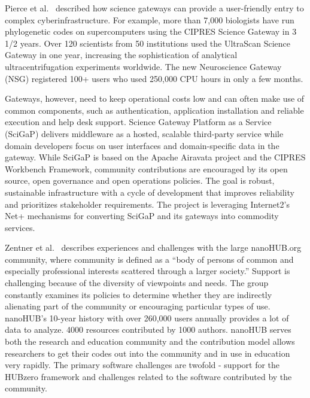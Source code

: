 \documentclass[11pt, oneside]{amsart}
\newcommand{\toolname}[1] {\textsf{#1}}
\begin{document}
Pierce et al.~\cite{Pierce2_WSSSPE} described how science gateways can provide a user-friendly
entry to complex cyberinfrastructure. For example, more than 7,000
biologists have run phylogenetic codes on supercomputers using the \toolname{CIPRES}
Science Gateway in 3 1/2 years. Over 120 scientists from 50 institutions used the
\toolname{UltraScan Science Gateway} in one year, increasing the sophistication of analytical
ultracentrifugation experiments worldwide. The new Neuroscience Gateway (\toolname{NSG})
registered 100+ users who used 250,000 CPU hours in only a few months.

Gateways, however, need to keep operational costs low and can often make use of
common components, such as authentication, application installation and
reliable execution and help desk support. Science Gateway Platform as a Service (\toolname{SciGaP}) delivers
middleware as a hosted, scalable third-party service while domain developers
focus on user interfaces and domain-specific data in the gateway.
While \toolname{SciGaP} is based on the \toolname{Apache Airavata} project
and the \toolname{CIPRES} Workbench Framework, community contributions are encouraged
by its open source, open governance and open operations policies. The
goal is robust, sustainable infrastructure with a cycle of development that
improves reliability and prioritizes stakeholder requirements. The project is
leveraging Internet2's \toolname{Net+} mechanisms for converting \toolname{SciGaP} and its gateways
into commodity services.

Zentner et al.~\cite{Zentner_WSSSPE} describes experiences and challenges with the large
\toolname{nanoHUB.org} community, where community is defined as a ``body of persons of
common and especially professional interests scattered through a larger
society.'' Support is challenging because of the diversity of
viewpoints and needs. The group constantly examines its policies to determine
whether they are indirectly alienating part of the community or encouraging
particular types of use.
%
\toolname{nanoHUB}'s 10-year history with over 260,000 users annually provides a lot of
data to analyze. 4000 resources contributed by 1000 authors. \toolname{nanoHUB} serves
both the research and education community and the contribution model allows
researchers to get their codes out into the community and in use in education
very rapidly. The primary software challenges are twofold - support for the
\toolname{HUBzero} framework and challenges related to the software contributed by the
community.
\end{document}
